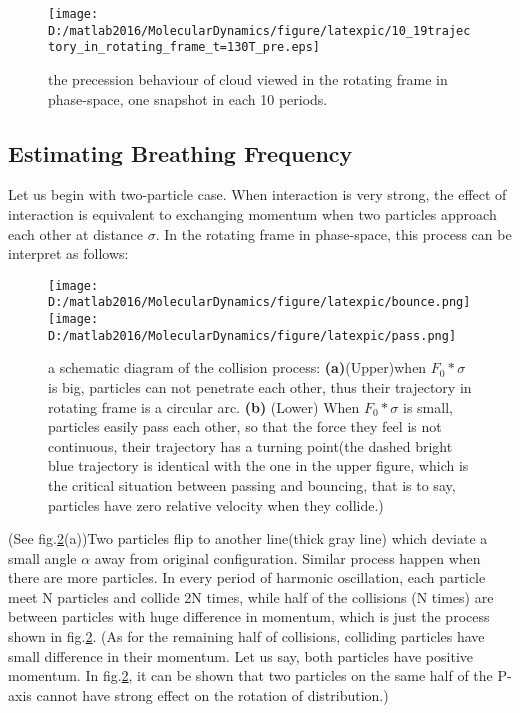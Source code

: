 \documentclass[aps,pre,twocolumn
,groupedaddress]{revtex4-1}
\begin{document}
\begin{figure}
\texttt{[image: D:/matlab2016/MolecularDynamics/figure/latexpic/10\_19trajectory\_in\_rotating\_frame\_t=130T\_pre.eps]}
\caption{the precession behaviour of cloud viewed in the rotating frame in phase-space, one snapshot in each 10 periods.}
\label{fig:Breathingfrequency2_2}
\end{figure}


\subsection{Estimating Breathing Frequency}
Let us begin with two-particle case. When interaction is very strong, the effect of interaction is equivalent to exchanging momentum when two particles approach each other at distance $\sigma$. In the rotating frame in phase-space, this process can be interpret as follows:

\begin{figure}
\centering
\texttt{[image: D:/matlab2016/MolecularDynamics/figure/latexpic/bounce.png]}
\texttt{[image: D:/matlab2016/MolecularDynamics/figure/latexpic/pass.png]}
\caption{a schematic diagram of the collision process: \textbf{(a)}(Upper)when $F_0*\sigma$ is big, particles can not penetrate each other, thus their trajectory in rotating frame is a circular arc.  \textbf{(b)} (Lower) When $F_0*\sigma$ is small, particles easily pass each other, so that the force they feel is not continuous, their trajectory has a turning point(the dashed bright blue trajectory is identical with the one in the upper figure, which is the critical situation between passing and bouncing, that is to say, particles have zero relative velocity when they collide.) }
\label{fig:Breathingfrequency3}
\end{figure}


(See fig.\ref{fig:Breathingfrequency3}(a))Two particles flip to another line(thick gray line) which deviate a small angle $\alpha$ away from original configuration. Similar process happen when there are more particles. In every period of harmonic oscillation, each particle meet N particles and collide 2N times, while half of the collisions (N times) are between particles with huge difference in momentum, which is just the process shown in fig.\ref{fig:Breathingfrequency3}. (As for the remaining half of collisions, colliding particles have small difference in their momentum. Let us say, both particles have positive momentum. In fig.\ref{fig:Breathingfrequency3}, it can be shown that two particles on the same half of the P-axis cannot have strong effect on the rotation of distribution.)
\end{document}
